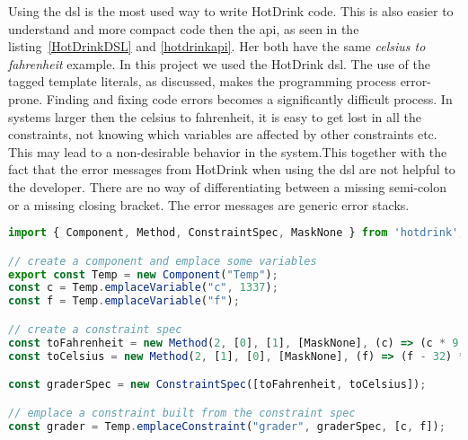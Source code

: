 Using the \gls{dsl} is the most used way to write HotDrink code. This is also easier to understand and more compact code then the \gls{api}, as seen in the listing~\ref{HotDrinkDSL} and \ref{hotdrinkapi}. Her both have the same \textit{celsius to fahrenheit} example. In this project we used the HotDrink \gls{dsl}. The use of the tagged template literals, as discussed, makes the programming process error-prone. Finding and fixing code errors becomes a significantly difficult process. In systems larger then the celsius to fahrenheit, it is easy to get lost in all the constraints, not knowing which variables are affected by other constraints etc. This may lead to a non-desirable behavior in the system.This together with the fact that the error messages from HotDrink when using the \gls{dsl} are not helpful to the developer. There are no way of differentiating between a missing semi-colon or a missing closing bracket. The error messages are generic error stacks. 

\begin{lstlisting}[caption={Example of how to use the HotDrink \gls{api} to simulate the relationship between fahrenheit and celsius},label=hotdrinkapi, language=JavaScript]
import { Component, Method, ConstraintSpec, MaskNone } from 'hotdrink';

// create a component and emplace some variables
export const Temp = new Component("Temp");
const c = Temp.emplaceVariable("c", 1337);
const f = Temp.emplaceVariable("f");

// create a constraint spec
const toFahrenheit = new Method(2, [0], [1], [MaskNone], (c) => (c * 9 / 5 + 32));
const toCelsius = new Method(2, [1], [0], [MaskNone], (f) => (f - 32) * 5 / 9);

const graderSpec = new ConstraintSpec([toFahrenheit, toCelsius]);

// emplace a constraint built from the constraint spec
const grader = Temp.emplaceConstraint("grader", graderSpec, [c, f]);
\end{lstlisting}
